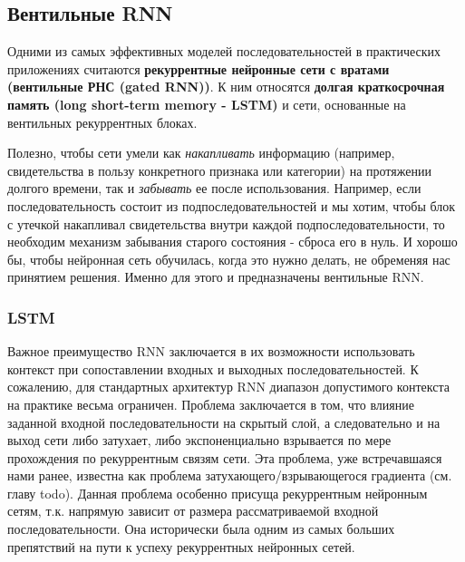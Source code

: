 
\subsection{Вентильные RNN}

Одними из самых эффективных моделей последовательностей в практических 
приложениях считаются \textbf{рекуррентные нейронные сети с вратами 
(вентильные РНС (gated RNN))}. К ним относятся
\textbf{долгая краткосрочная память (long short-term memory - LSTM)} 
и сети, основанные на вентильных рекуррентных блоках. 

Полезно, чтобы сети умели как \textit{накапливать} информацию 
(например, свидетельства в пользу конкретного признака или категории) на 
протяжении долгого времени, так и \textit{забывать} ее после использования. 
Например, если последовательность состоит из подпоследовательностей 
и мы хотим, чтобы блок с утечкой накапливал свидетельства
внутри каждой подпоследовательности, то необходим механизм забывания старого
состояния - сброса его в нуль. И хорошо бы, чтобы нейронная сеть обучилась, 
когда это нужно делать, не обременяя нас принятием решения. 
Именно для этого и предназначены вентильные RNN.

\subsubsection{LSTM}

Важное преимущество RNN заключается в их возможности использовать 
контекст при сопоставлении входных и выходных последовательностей. 
К сожалению, для стандартных архитектур RNN диапазон допустимого контекста 
на практике весьма ограничен. Проблема заключается в том, что влияние 
заданной входной последовательности на скрытый слой, а следовательно и 
на выход сети либо затухает, либо экспоненциально взрывается по мере 
прохождения по рекуррентным связям сети. Эта проблема, уже встречавшаяся 
нами ранее, известна как проблема затухающего/взрывающегося градиента 
(см. главу {\color{red} todo}). Данная проблема особенно присуща 
рекуррентным нейронным сетям, т.к. напрямую зависит от размера рассматриваемой 
входной последовательности. Она исторически была одним из самых 
больших препятствий на пути к успеху рекуррентных нейронных сетей.

